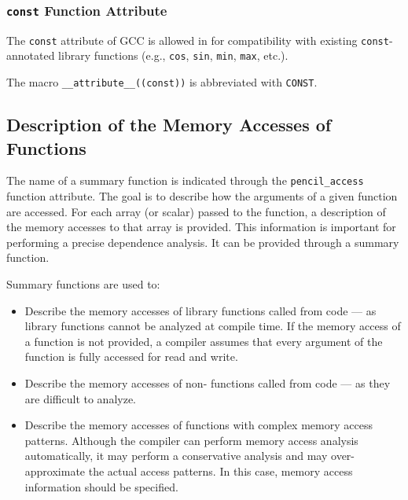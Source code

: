 \subsubsection{\lstinline!const! Function Attribute}
\label{sec:const-attribute}


  The \lstinline!const! attribute of GCC is allowed in
  \pencil for compatibility with existing \lstinline!const!-annotated
  library functions (e.g., \lstinline!cos!, \lstinline!sin!, \lstinline!min!,
  \lstinline!max!, etc.).

  The macro \lstinline!__attribute__((const))! is abbreviated with \lstinline!CONST!.
  
\subsection{Description of the Memory Accesses of Functions}
\label{sec:summaries}



  The name of a summary function is indicated through
  the \lstinline!pencil_access! function attribute.
  The goal is to describe how the arguments of a given
  function are accessed.
  For each array (or scalar) passed to the function,
  a description of the memory accesses to that array is provided.
  This information is important for performing a precise dependence
  analysis.
  It can be provided through a summary function.
  
  Summary functions are used to:
    \begin{itemize}
     \item Describe the memory accesses of library functions
     called from \pencil code --- as library functions cannot be analyzed at
     compile time.
     If the memory access of a function is not provided, a \pencil
     compiler assumes that every argument of the function is fully accessed
     for read and write.
     
     \item Describe the memory accesses of non-\pencil
     functions called from \pencil code --- as they are difficult
     to analyze.

     \item Describe the memory accesses of \pencil functions with complex
     memory access patterns.
     Although the compiler can perform memory access analysis automatically,
     it may perform a conservative analysis and may over-approximate the
     actual access patterns.  In this case, memory access information should
     be specified.
    \end{itemize}


